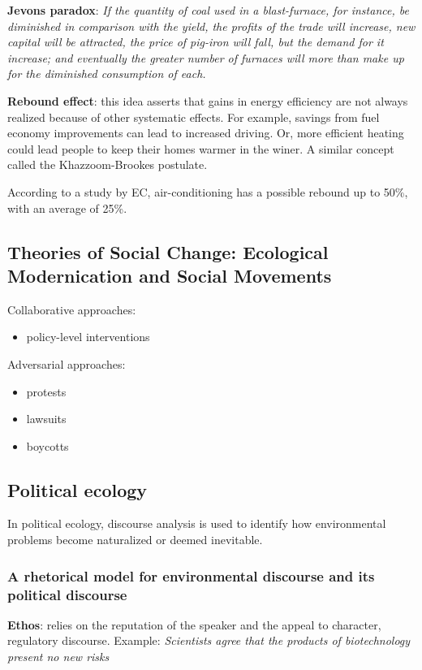 \textbf{Jevons paradox}: \textit{
If the quantity of coal used in a blast-furnace, for instance, be diminished
in comparison with the yield, the profits of the trade will increase, new
capital will be attracted, the price of pig-iron will fall, but the demand for
it increase; and eventually the greater number of furnaces will more than make
up for the diminished consumption of each.
}

\textbf{Rebound effect}: this idea asserts that gains in energy efficiency are
not always realized because of other systematic effects. For example, savings
from fuel economy improvements can lead to increased driving. Or, more
efficient heating could lead people to keep their homes warmer in the winer.
A similar concept called the Khazzoom-Brookes postulate.

According to a study by EC, air-conditioning has a possible rebound up to
50\%, with an average of 25\%.

\subsection{Theories of Social Change: Ecological Modernication and Social
Movements}

Collaborative approaches:
\begin{itemize}
	\item policy-level interventions
\end{itemize}

Adversarial approaches:
\begin{itemize}
	\item protests
	\item lawsuits
	\item boycotts
\end{itemize}

\subsection{Political ecology}

In political ecology, discourse analysis is used to identify how
environmental problems become naturalized or deemed inevitable.

\subsubsection{A rhetorical model for environmental discourse and its political
discourse}

\textbf{Ethos}: relies on the reputation of the speaker and the appeal to
character, regulatory discourse. Example: \textit{Scientists agree that the
products of biotechnology present no new risks}

